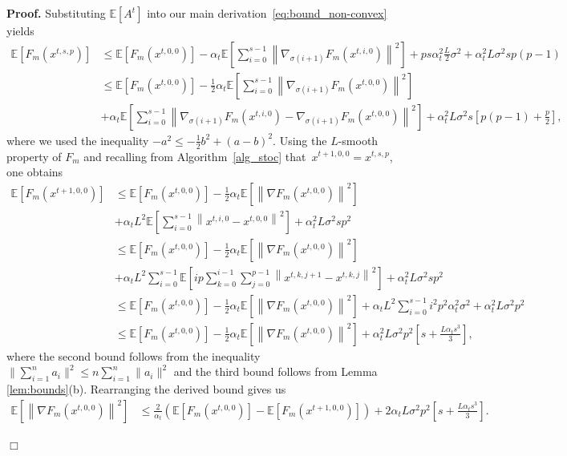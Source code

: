 \documentclass[11pt,a4paper]{article}
\numberwithin{equation}{section}%
\newenvironment{proof}[1][Proof]{\noindent \textbf{#1.} }{\hfill$\Box$\par\medskip}
\renewcommand{\(}{\left (}
\renewcommand{\)}{\right )}
\newcommand{\Lphif}{L}
\newcommand{\Fm}{F_m}
\begin{document}
\begin{proof}
Substituting $\mathbb{E}[A^t]$ into our main derivation~\eqref{eq:bound_non-convex} yields
\begin{align*}
\mathbb{E} [\Fm(x^{t,s,p})]
&\leq \mathbb{E} [\Fm(x^{t,0,0})] - \alpha_t \mathbb{E} \left[\sum_{i=0}^{s-1}\left\| \nabla_{\sigma(i+1)} \Fm(x^{t,i,0})  \right\|^2 \right]   + ps\alpha_t^2 \frac{\Lphif}{2} \sigma^2 + \alpha_t^2 \Lphif \sigma^2s p(p-1)\\
&\leq \mathbb{E} [\Fm(x^{t,0,0})]  -\frac{1}{2} \alpha_t \mathbb{E} \left[\sum_{i=0}^{s-1}\left\| \nabla_{\sigma(i+1)} \Fm(x^{t,0,0})  \right\|^2 \right]  \\
&+ \alpha_t \mathbb{E} \left[\sum_{i=0}^{s-1}\left\| \nabla_{\sigma(i+1)} \Fm(x^{t,i,0}) -\nabla_{\sigma(i+1)} \Fm(x^{t,0,0})  \right\|^2 \right]+ \alpha_t^2 \Lphif \sigma^2 s \left[p(p-1)+ \frac{p}{2}\right],
\end{align*}
where we used the inequality $-a^2 \leq -\frac{1}{2} b^2 +(a-b)^2$. Using the $\Lphif$-smooth property of $\Fm$ and recalling from Algorithm~\ref{alg_stoc} that~$x^{t+1,0,0} = x^{t,s,p}$, one obtains
\begin{align*}%
\mathbb{E} [\Fm(x^{t+1,0,0})]
&\leq \mathbb{E} [\Fm(x^{t,0,0})]  -\frac{1}{2} \alpha_t \mathbb{E} \left[\left\| \nabla \Fm(x^{t,0,0})  \right\|^2 \right]  \nonumber \\
&+ \alpha_t \Lphif^2\mathbb{E} \left[\sum_{i=0}^{s-1}\left\|x^{t,i,0} - x^{t,0,0}\right\|^2 \right]+ \alpha_t^2 \Lphif \sigma^2 sp^2 \nonumber \\
&\leq \mathbb{E} [\Fm(x^{t,0,0})]  -\frac{1}{2} \alpha_t \mathbb{E} \left[\left\| \nabla \Fm(x^{t,0,0})  \right\|^2 \right]  \nonumber \\
&+ \alpha_t \Lphif^2 \sum_{i=0}^{s-1} \mathbb{E} \left[ip \sum_{k=0}^{i-1} \sum_{j=0}^{p-1} \left\|  x^{t,k,j+1} - x^{t,k,j}\right\|^2 \right]+ \alpha_t^2 \Lphif \sigma^2 sp^2 \nonumber \\
&\leq \mathbb{E} [\Fm(x^{t,0,0})]  -\frac{1}{2} \alpha_t \mathbb{E} \left[\left\| \nabla \Fm(x^{t,0,0})  \right\|^2 \right] +\alpha_t\Lphif^2 \sum_{i=0}^{s-1}  i^2p^2\alpha^2_t \sigma^2+ \alpha_t^2 \Lphif \sigma^2 p^2 \nonumber \\
&\leq \mathbb{E} [\Fm(x^{t,0,0})]  -\frac{1}{2} \alpha_t \mathbb{E} \left[\left\| \nabla \Fm(x^{t,0,0})  \right\|^2 \right]   + \alpha_t^2 \Lphif \sigma^2 p^2\left[s + \frac{\Lphif \alpha_t  s^3}{3}\right],
\end{align*}
where the second bound follows from the inequality $\|\sum_{i=1}^n a_i\|^2 \leq n\sum_{i=1}^n \| a_i\|^2 $ and the third bound follows from  Lemma \ref{lem:bounds}(b).
Rearranging the derived bound gives us
\begin{align*}
\mathbb{E} \left[\left\| \nabla \Fm(x^{t,0,0})  \right\|^2 \right] 
&\leq  \frac{2}{\alpha_t} \left(   \mathbb{E} [\Fm(x^{t,0,0})] - \mathbb{E} [\Fm(x^{t+1,0,0})] \right)  + 2\alpha_t \Lphif \sigma^2 p^2\left[s + \frac{\Lphif \alpha_t  s^3}{3}\right].
\end{align*}


\end{proof}
\end{document}
